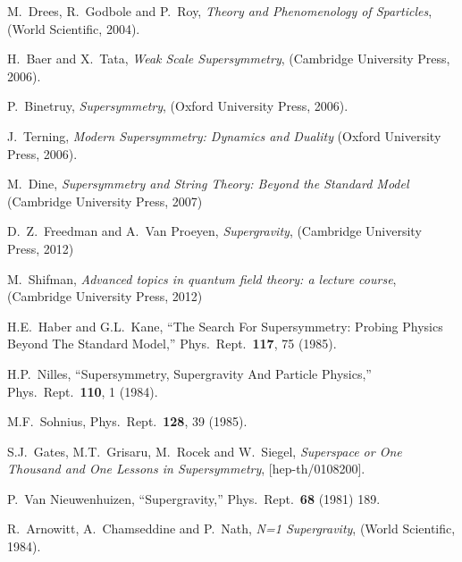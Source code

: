 \documentclass[11pt]{article}
\begin{document}
\begin{thebibliography}{999}
M.~Drees, R.~Godbole and P.~Roy, 
  {\em Theory and Phenomenology of Sparticles}, 
  (World Scientific, 2004).

H.~Baer and X.~Tata, 
  {\em Weak Scale Supersymmetry},
  (Cambridge University Press, 2006).

P.~Binetruy,
  {\em Supersymmetry},
  (Oxford University Press, 2006).

J.~Terning,
  {\em Modern Supersymmetry: Dynamics and Duality}
  (Oxford University Press, 2006).

M.~Dine,
  {\em Supersymmetry and String Theory: Beyond the Standard Model}
  (Cambridge University Press, 2007) 

  D.~Z.~Freedman and A.~Van Proeyen, 
  {\em Supergravity}, (Cambridge University Press, 2012) 

  M.~Shifman,
  {\em Advanced topics in quantum field theory: a lecture course},
  (Cambridge University Press, 2012) 
  
  
H.E.~Haber and G.L.~Kane,
  ``The Search For Supersymmetry: Probing Physics Beyond The Standard Model,''
  Phys.\ Rept.\  {\bf 117}, 75 (1985).

H.P.~Nilles, 
  ``Supersymmetry, Supergravity And Particle Physics,''
  Phys.\ Rept.\  {\bf 110}, 1 (1984).

M.F.~Sohnius,
  Phys.\ Rept.\  {\bf 128}, 39 (1985).

S.J.~Gates, M.T.~Grisaru, M.~Rocek and W.~Siegel,
  {\em Superspace or One Thousand and One Lessons in Supersymmetry},
  [hep-th/0108200].

P.~Van Nieuwenhuizen,
  ``Supergravity,''
  Phys.\ Rept.\  {\bf 68} (1981) 189.

R.~Arnowitt, A.~Chamseddine and P.~Nath,
  {\em N=1 Supergravity}, 
  (World Scientific, 1984).


\end{thebibliography}
\end{document}
